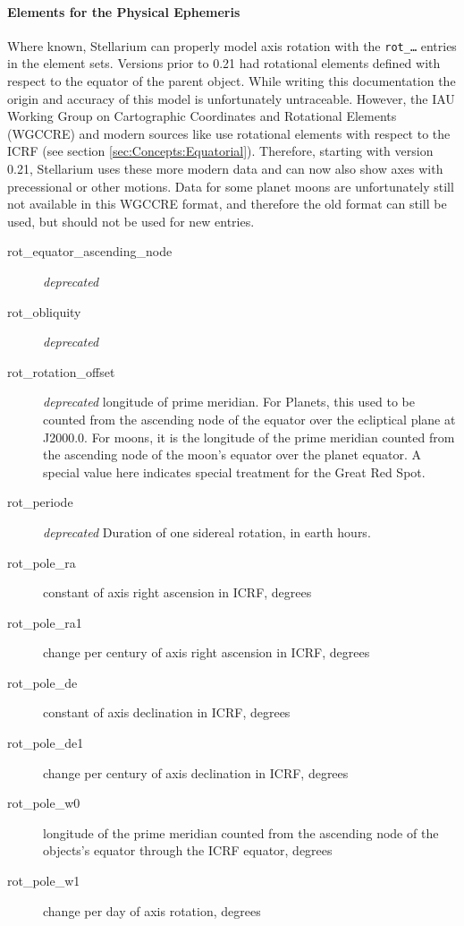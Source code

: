 \paragraph{Elements for the Physical Ephemeris}

Where known, Stellarium can properly model axis rotation with the
\texttt{rot\_\ldots} entries in the element sets.  Versions prior to
0.21 had rotational elements defined with respect to the equator of
the parent object. While writing this documentation the origin and
accuracy of this model is unfortunately untraceable.  However, the IAU
Working Group on Cartographic Coordinates and Rotational Elements
(WGCCRE) and modern sources like \citet{ESAA:2013} use rotational
elements with respect to the ICRF (see section
\ref{sec:Concepts:Equatorial}). Therefore, starting with version 0.21,
Stellarium uses these more modern data and can now also show axes with
precessional or other motions. Data for some planet moons are
unfortunately still not available in this WGCCRE format, and therefore
the old format can still be used, but should not be used for new
entries.

\begin{description}
\item[rot\_equator\_ascending\_node] \emph{deprecated}
\item[rot\_obliquity] \emph{deprecated}
\item[rot\_rotation\_offset] \emph{deprecated} longitude of prime
  meridian. For Planets, this used to be counted from the ascending
  node of the equator over the ecliptical plane at J2000.0. For moons,
  it is the longitude of the prime meridian counted from the ascending
  node of the moon's equator over the planet equator.  A special value
  here indicates special treatment for the Great Red Spot.
\item[rot\_periode] \emph{deprecated} Duration of one sidereal rotation, in earth hours.

\item[rot\_pole\_ra]  constant of axis right ascension in ICRF, degrees
\item[rot\_pole\_ra1] change per century of axis right ascension in ICRF, degrees
\item[rot\_pole\_de] constant of axis declination in ICRF, degrees
\item[rot\_pole\_de1] change per century of axis declination in ICRF, degrees
\item[rot\_pole\_w0] longitude of the prime meridian counted from the
  ascending node of the objects's equator through the ICRF equator, degrees
\item[rot\_pole\_w1] change per day of axis rotation, degrees
\end{description}

